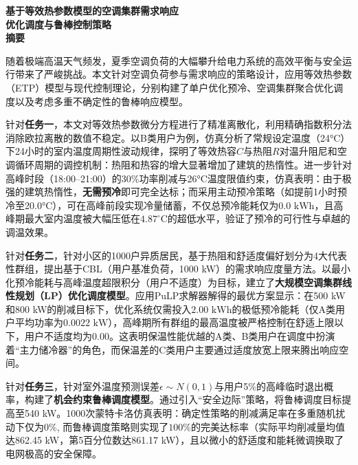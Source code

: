 \documentclass[12pt,a4paper]{article}
\begin{document}
\pagestyle{plain}
\setcounter{page}{1}

\begin{center}
    {\bfseries\heiti 基于等效热参数模型的空调集群需求响应\\优化调度与鲁棒控制策略}\\[0.5cm]
    {\bfseries 摘要}
\end{center}

随着极端高温天气频发，夏季空调负荷的大幅攀升给电力系统的高效平衡与安全运行带来了严峻挑战。本文针对空调负荷参与需求响应的策略设计，应用等效热参数（ETP）模型与现代控制理论，分别构建了单户优化预冷、空调集群聚合优化调度以及考虑多重不确定性的鲁棒响应模型。

针对\textbf{任务一}，本文对等效热参数微分方程进行了精准离散化，利用精确指数积分法消除欧拉离散的数值不稳定。以B类用户为例，仿真分析了常规设定温度（24°C）下24小时的室内温度周期性波动规律，探明了等效热容$C$与热阻$R$对温升阻尼和空调循环周期的调控机制：热阻和热容的增大显著增加了建筑的热惰性。进一步针对高峰时段（18:00–21:00）的30\%功率削减与26°C温度限值约束，仿真表明：由于极强的建筑热惰性，\textbf{无需预冷}即可完全达标；而采用主动预冷策略（如提前1小时预冷至20.0°C），可在高峰前段实现冷量储蓄，不仅总预冷能耗仅为$0.0\text{ kWh}$，且高峰期最大室内温度被大幅压低在$4.87^\circ\text{C}$的超低水平，验证了预冷的可行性与卓越的调温效果。

针对\textbf{任务二}，针对小区的1000户异质居民，基于热阻和舒适度偏好划分为4大代表性群组，提出基于CBL（用户基准负荷，1000 kW）的需求响应度量方法。以最小化预冷能耗与高峰温度超限积分（用户不适度）为目标，建立了\textbf{大规模空调集群线性规划（LP）优化调度模型}。应用PuLP求解器解得的最优方案显示：在500 kW和800 kW的削减目标下，优化系统仅需投入$2.00\text{ kWh}$的极低预冷能耗（仅A类用户平均功率为$0.0022\text{ kW}$），高峰期所有群组的最高温度被严格控制在舒适上限以下，用户不适度均为$0.00$。这表明保温性能优越的A类、B类用户在调度中扮演着“主力储冷器”的角色，而保温差的C类用户主要通过适度放宽上限来腾出响应空间。

针对\textbf{任务三}，针对室外温度预测误差$\epsilon \sim N(0, 1)$与用户5\%的高峰临时退出概率，构建了\textbf{机会约束鲁棒调度模型}。通过引入“安全边际”策略，将鲁棒调度目标提高至540 kW。1000次蒙特卡洛仿真表明：确定性策略的削减满足率在多重随机扰动下仅为$0\%$, 而鲁棒调度策略则实现了$100\%$的完美达标率（实际平均削减量均值达862.45 kW，第5百分位数达861.17 kW），且以微小的舒适度和能耗微调换取了电网极高的安全保障。
\end{document}

